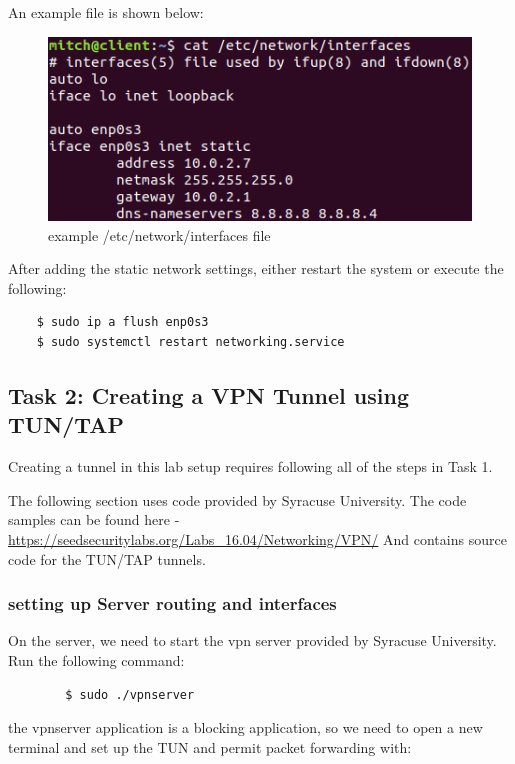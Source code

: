 \documentclass[12pt]{article}
\begin{document}
    An example file is shown below:
    
    \begin{figure}[H]
        \begin{center}
            \includegraphics[scale=0.5]{setting_up_client_2.png}
        \end{center}{}
        \caption{example /etc/network/interfaces file}
        \label{fig:setting_up_client_2}
    \end{figure}
    
    
    After adding the static network settings, either restart the system or execute the following:
    \begin{verbatim}
    $ sudo ip a flush enp0s3
    $ sudo systemctl restart networking.service
    \end{verbatim}


\clearpage
\subsection{Task 2: Creating a VPN Tunnel using TUN/TAP}
    Creating a tunnel in this lab setup requires following all of the steps in Task 1. 

    The following section uses code provided by Syracuse University. The code samples can be found here - \url{https://seedsecuritylabs.org/Labs_16.04/Networking/VPN/} And contains source code for the TUN/TAP tunnels.

\subsubsection{setting up Server routing and interfaces}
    On the server, we need to start the vpn server provided by Syracuse University. Run the following command:
    
    \begin{verbatim}
        $ sudo ./vpnserver
    \end{verbatim}
    
    the vpnserver application is a blocking application, so we need to open a new terminal and set up the TUN and permit packet forwarding with:
    
\end{document}
